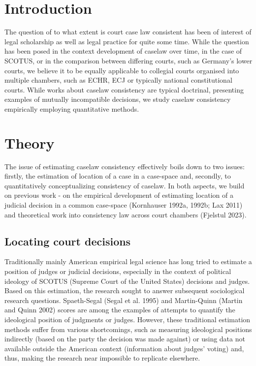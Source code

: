 \documentclass[
  11pt,
]{article}
\begin{document}
\setlength{\parindent}{16pt}
\setlength{\parskip}{0pt}

\doublespacing
\section{Introduction}\label{introduction}

The question of to what extent is court case law consistent has been of
interest of legal scholarship as well as legal practice for quite some
time. While the question has been posed in the context development of
caselaw over time, in the case of SCOTUS, or in the comparison between
differing courts, such as Germany's lower courts, we believe it to be
equally applicable to collegial courts organised into multiple chambers,
such as ECHR, ECJ or typically national constitutional courts. While
works about caselaw consistency are typical doctrinal, presenting
examples of mutually incompatible decisions, we study caselaw
consistency empirically employing quantitative methods.

\section{Theory}\label{theory}

The issue of estimating caselaw consistency effectively boils down to
two issues: firstly, the estimation of location of a case in a
case-space and, secondly, to quantitatively conceptualizing consistency
of caselaw. In both aspects, we build on previous work - on the
empirical development of estimating location of a judicial decision in a
common case-space (Kornhauser 1992a, 1992b; Lax 2011) and theoretical
work into consistency law across court chambers (Fjelstul 2023).

\subsection{Locating court decisions}\label{locating-court-decisions}

Traditionally mainly American empirical legal science has long tried to
estimate a position of judges or judicial decisions, especially in the
context of political ideology of SCOTUS (Supreme Court of the United
States) decisions and judges. Based on this estimation, the research
sought to answer subsequent sociological research questions.
Spaeth-Segal (Segal et al. 1995) and Martin-Quinn (Martin and Quinn
2002) scores are among the examples of attempts to quantify the
ideological position of judgments or judges. However, these traditional
estimation methods suffer from various shortcomings, such as measuring
ideological positions indirectly (based on the party the decision was
made against) or using data not available outside the American context
(information about judges' voting) and, thus, making the research near
impossible to replicate elsewhere.
\end{document}
